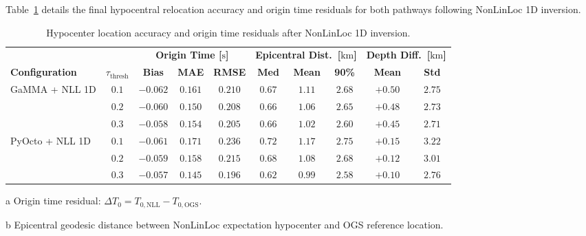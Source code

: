 Table~\ref{tab:nonlinloc_residuals} details the final hypocentral relocation accuracy and origin time residuals for both pathways following NonLinLoc 1D inversion.

\begin{table}[htbp]
  \centering
  \small
  \caption{Hypocenter location accuracy and origin time residuals after NonLinLoc 1D inversion.}
  \label{tab:nonlinloc_residuals}
  \begin{threeparttable}
    \begin{tabularx}{\linewidth}{l c c c c c c c c c}
      \toprule
      & & \multicolumn{3}{c}{\textbf{Origin Time [$\unit{\second}$]}\tnote{a}} & \multicolumn{3}{c}{\textbf{Epicentral Dist.\ [$\unit{\kilo\meter}$]}\tnote{b}} & \multicolumn{2}{c}{\textbf{Depth Diff.\ [$\unit{\kilo\meter}$]}\tnote{c}} \\
      \cmidrule(lr){3-5} \cmidrule(lr){6-8} \cmidrule(lr){9-10}
      \textbf{Configuration} & $\tau_{\mathrm{thresh}}$ & \textbf{Bias} & \textbf{MAE} & \textbf{RMSE} & \textbf{Med} & \textbf{Mean} & \textbf{90\%} & \textbf{Mean} & \textbf{Std} \\
      \midrule
      \multirow{3}{*}{GaMMA + NLL 1D} & $0.1$ & $-0.062$ & $\mathbf{0.161}$ & $0.210$ & $\mathbf{0.67}$ & $1.11$ & $\mathbf{2.68}$ & $+0.50$ & $\mathbf{2.75}$ \\
      & $0.2$ & $-0.060$ & $0.150$ & $0.208$ & $0.66$ & $1.06$ & $2.65$ & $+0.48$ & $2.73$ \\
      & $0.3$ & $-0.058$ & $0.154$ & $0.205$ & $0.66$ & $1.02$ & $2.60$ & $+0.45$ & $2.71$ \\
      \midrule
      \multirow{3}{*}{PyOcto + NLL 1D} & $0.1$ & $-0.061$ & $0.171$ & $0.236$ & $0.72$ & $1.17$ & $2.75$ & $\mathbf{+0.15}$ & $3.22$ \\
      & $0.2$ & $-0.059$ & $0.158$ & $0.215$ & $0.68$ & $1.08$ & $2.68$ & $+0.12$ & $3.01$ \\
      & $0.3$ & $-0.057$ & $\mathbf{0.145}$ & $\mathbf{0.196}$ & $\mathbf{0.62}$ & $\mathbf{0.99}$ & $\mathbf{2.58}$ & $+0.10$ & $2.76$ \\
      \bottomrule
    \end{tabularx}
    \begin{tablenotes}[flushleft]
      \footnotesize
      \item[a] Origin time residual: $\Delta T_0 = T_{0, \mathrm{NLL}} - T_{0, \mathrm{OGS}}$.
      \item[b] Epicentral geodesic distance between NonLinLoc expectation hypocenter and OGS reference location.

\end{tablenotes}
\end{threeparttable}
\end{table}

